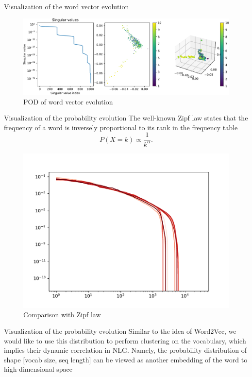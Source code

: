 \documentclass{beamer}
\begin{document}
\begin{frame}{Visualization of the word vector evolution}
	\begin{figure}
		\includegraphics[width=\textwidth]{fig/pod_1.pdf}
		\caption{POD of word vector evolution}
	\end{figure}
\end{frame}

\begin{frame}{Visualization of the probability evolution}
	The well-known Zipf law states that the frequency of a word is inversely proportional to its rank in the frequency table
	\begin{equation}
		P(X=k) \propto \frac{1}{k^{\alpha}}.
	\end{equation}
	\begin{figure}[ht]
		\centering
		\includegraphics[width=.7\textwidth]{fig/zipf.pdf}
		\caption{Comparison with Zipf law}
	\end{figure}
\end{frame}

\begin{frame}{Visualization of the probability evolution}
	Similar to the idea of Word2Vec, we would like to use this distribution to perform clustering on the
	vocabulary, which implies their dynamic correlation in NLG. Namely, the probability distribution of shape
	[vocab size, seq length] can be viewed as another embedding of the word to high-dimensional space
\end{frame}
\end{document}
